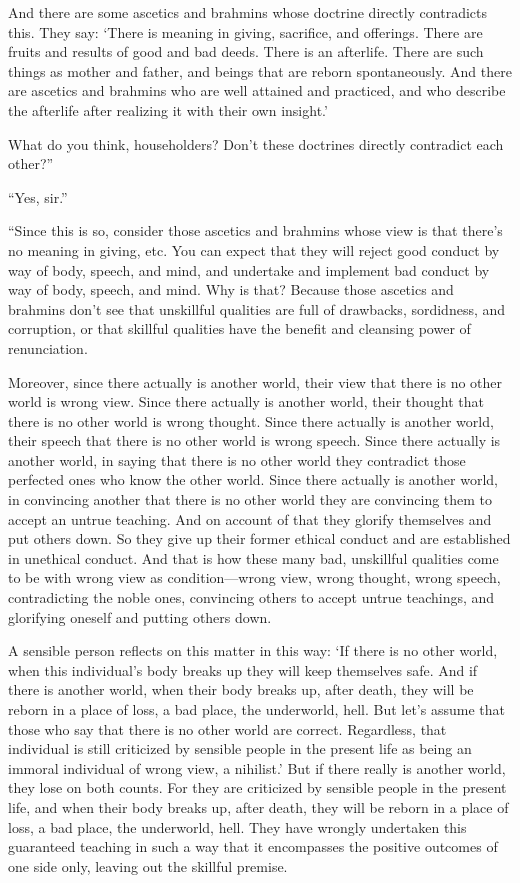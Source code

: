 \documentclass[12pt,openany]{book}%
\begin{document}
And there are some ascetics and brahmins whose doctrine directly contradicts this. They say: ‘There is meaning in giving, sacrifice, and offerings. There are fruits and results of good and bad deeds. There is an afterlife. There are such things as mother and father, and beings that are reborn spontaneously. And there are ascetics and brahmins who are well attained and practiced, and who describe the afterlife after realizing it with their own insight.’ 

What do you think, householders? Don’t these doctrines directly contradict each other?” 

“Yes, sir.” 

“Since this is so, consider those ascetics and brahmins whose view is that there’s no meaning in giving, etc. You can expect that they will reject good conduct by way of body, speech, and mind, and undertake and implement bad conduct by way of body, speech, and mind. Why is that? Because those ascetics and brahmins don’t see that unskillful qualities are full of drawbacks, sordidness, and corruption, or that skillful qualities have the benefit and cleansing power of renunciation. 

Moreover, since there actually is another world, their view that there is no other world is wrong view. Since there actually is another world, their thought that there is no other world is wrong thought. Since there actually is another world, their speech that there is no other world is wrong speech. Since there actually is another world, in saying that there is no other world they contradict those perfected ones who know the other world. Since there actually is another world, in convincing another that there is no other world they are convincing them to accept an untrue teaching. And on account of that they glorify themselves and put others down. So they give up their former ethical conduct and are established in unethical conduct. And that is how these many bad, unskillful qualities come to be with wrong view as condition—wrong view, wrong thought, wrong speech, contradicting the noble ones, convincing others to accept untrue teachings, and glorifying oneself and putting others down. 

A sensible person reflects on this matter in this way: ‘If there is no other world, when this individual’s body breaks up they will keep themselves safe. And if there is another world, when their body breaks up, after death, they will be reborn in a place of loss, a bad place, the underworld, hell. But let’s assume that those who say that there is no other world are correct. Regardless, that individual is still criticized by sensible people in the present life as being an immoral individual of wrong view, a nihilist.’ But if there really is another world, they lose on both counts. For they are criticized by sensible people in the present life, and when their body breaks up, after death, they will be reborn in a place of loss, a bad place, the underworld, hell. They have wrongly undertaken this guaranteed teaching in such a way that it encompasses the positive outcomes of one side only, leaving out the skillful premise. 
\end{document}
